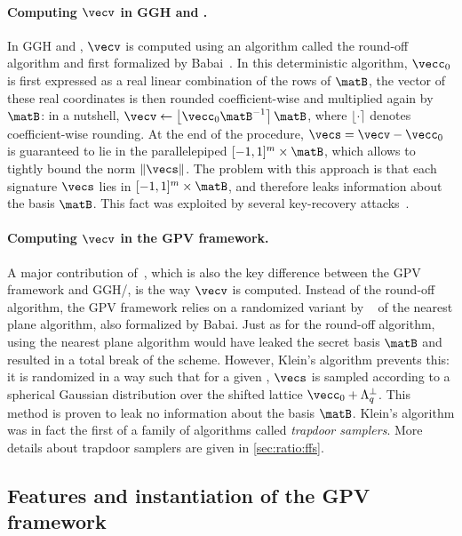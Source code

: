\paragraph{Computing $\vecv$ in GGH and \ntrusign.}
 In GGH and \ntrusign, $\vecv$ is computed using an algorithm called the round-off algorithm and first formalized by Babai~\cite{STACS:Babai85,Combinatorica:Babai86}. In this deterministic algorithm, $\vecc_0$ is first expressed as a real linear combination of the rows of $\matB$, the vector of these real coordinates is then rounded coefficient-wise and multiplied again by $\matB$: in a nutshell, $\vecv \gets \left\lfloor \vecc_0 \matB^{-1} \right\rceil \matB$, where $\lfloor\cdot\rceil$ denotes coefficient-wise rounding. At the end of the procedure, $\vecs = \vecv- \vecc_0$ is guaranteed to lie in the parallelepiped $[-1, 1]^m \times \matB$, which allows to tightly bound the norm $\|\vecs\|$.
%
 The problem with this approach is that each signature $\vecs$ lies in $[-1, 1]^m \times \matB$, and therefore leaks information about the basis $\matB$. This fact was exploited by several key-recovery attacks~\cite{EC:NguReg06,AC:DucNgu12b}.

\paragraph{Computing $\vecv$ in the GPV framework.}
 A major contribution of~\cite{STOC:GenPeiVai08}, which is also the key difference between the GPV framework and GGH/\ntrusign, is the way $\vecv$ is computed. Instead of the round-off algorithm, the GPV framework relies on a randomized variant by  ~\cite{SODA:Klein00} of the nearest plane algorithm, also formalized by Babai.
 Just as for the round-off algorithm, using the nearest plane algorithm would have leaked the secret basis $\matB$ and resulted in a total break of the scheme. However, Klein's algorithm prevents this: it is randomized in a way such that for a given \msg, $\vecs$ is sampled according to a spherical Gaussian distribution over the shifted lattice $\vecc_0 + \Lambda_q^\perp$. This method is proven to leak no information about the basis $\matB$. Klein's algorithm was in fact the first of a family of algorithms called \textit{trapdoor samplers}. More details about trapdoor samplers are given in \cref{sec:ratio:ffs}.

\subsection{Features and instantiation of the GPV framework}\label{sec:ratio:features}

